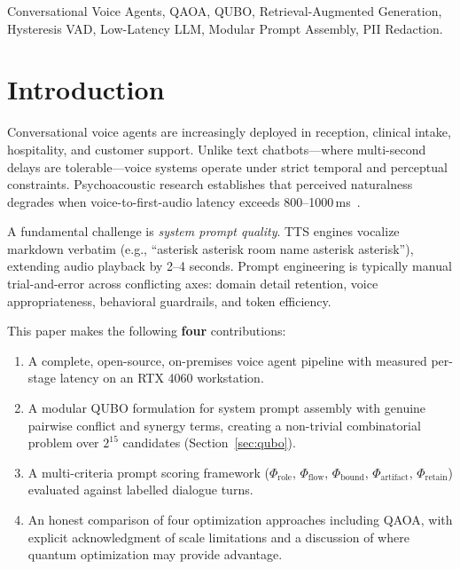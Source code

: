 \documentclass[journal]{IEEEtran}
\begin{document}
\begin{IEEEkeywords}
Conversational Voice Agents, QAOA, QUBO, Retrieval-Augmented Generation,
Hysteresis VAD, Low-Latency LLM, Modular Prompt Assembly, PII Redaction.
\end{IEEEkeywords}

\section{Introduction}

Conversational voice agents are increasingly deployed in reception, clinical
intake, hospitality, and customer support. Unlike text chatbots---where
multi-second delays are tolerable---voice systems operate under strict
temporal and perceptual constraints. Psychoacoustic research establishes that
perceived naturalness degrades when voice-to-first-audio latency exceeds
800--1000\,ms~\cite{larson2020}.

A fundamental challenge is \textit{system prompt quality}. TTS engines
vocalize markdown verbatim (e.g., ``asterisk asterisk room name asterisk
asterisk''), extending audio playback by 2--4 seconds. Prompt engineering
is typically manual trial-and-error across conflicting axes: domain detail
retention, voice appropriateness, behavioral guardrails, and token efficiency.

This paper makes the following \textbf{four} contributions:
\begin{enumerate}
    \item A complete, open-source, on-premises voice agent pipeline with
    measured per-stage latency on an RTX 4060 workstation.
    \item A modular QUBO formulation for system prompt assembly with genuine
    pairwise conflict and synergy terms, creating a non-trivial combinatorial
    problem over $2^{15}$ candidates (Section~\ref{sec:qubo}).
    \item A multi-criteria prompt scoring framework ($\Phi_\text{role}$,
    $\Phi_\text{flow}$, $\Phi_\text{bound}$, $\Phi_\text{artifact}$,
    $\Phi_\text{retain}$) evaluated against labelled dialogue turns.
    \item An honest comparison of four optimization approaches including QAOA,
    with explicit acknowledgment of scale limitations and a discussion of where
    quantum optimization may provide advantage.
\end{enumerate}
\end{document}
